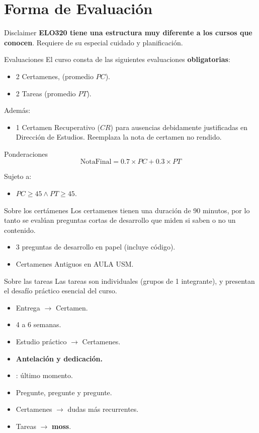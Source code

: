\documentclass{beamer}
\begin{document}
\section{Forma de Evaluación}
\begin{frame}{Disclaimer}
\huge\textbf{ELO320 tiene una estructura muy diferente a los cursos que conocen}. Requiere de su especial cuidado y planificación.

\end{frame}
\begin{frame}{Evaluaciones}
El curso consta de las siguientes evaluaciones \textbf{obligatorias}:
\begin{itemize}
\item 2 Certamenes, (promedio $PC$). 
\item 2 Tareas (promedio $PT$). 
\end{itemize}
Además:
\begin{itemize}
\item 1 Certamen Recuperativo ($CR$) para ausencias debidamente justificadas en Dirección de Estudios. Reemplaza la nota de certamen no rendido.
\end{itemize}
\begin{exampleblock}{Ponderaciones}
$$ \text{NotaFinal} = 0.7 \times PC + 0.3 \times PT $$
\end{exampleblock}

Sujeto a: 
\begin{itemize}
\item $PC \geq 45 \land PT \geq 45$.
\end{itemize}
\end{frame}

\begin{frame}{Sobre los certámenes}
Los certamenes tienen una duración de 90 minutos, por lo tanto se evalúan preguntas cortas de desarrollo que miden si saben o no un contenido.
\begin{itemize}
\item 3 preguntas de desarrollo en papel (incluye código).
\item Certamenes Antiguos en AULA USM. 
\end{itemize}
\end{frame}

\begin{frame}{Sobre las tareas}
Las tareas son individuales (grupos de 1 integrante), y presentan el desafío práctico esencial del curso.  
\begin{itemize}
\item Entrega $\rightarrow$ Certamen.
\item 4 a 6 semanas.
\item Estudio práctico $\rightarrow$ Certamenes. 
\item \textbf{Antelación y dedicación.}
\item {}: último momento. 
\item Pregunte, pregunte y pregunte. 
\item Certamenes $\rightarrow$ dudas más recurrentes.
\item Tareas $\rightarrow$ \textbf{moss}.
\end{itemize}
\end{frame}
\end{document}

